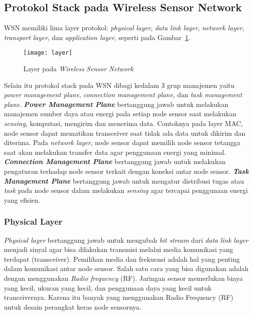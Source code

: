 \subsection{Protokol Stack pada Wireless Sensor Network \cite{a_wireless_sensor} \cite{handbook} \cite{overview:0:wireless}} 
WSN memiliki lima layer protokol: \textit{physical layer}, \textit{data link layer}, \textit{network layer}, \textit{transport layer}, dan \textit{application layer}, seperti pada Gambar~\ref{fig:layer}. 

\begin{figure} [H]
	\centering  
	\texttt{[image: layer]}  
	\caption[Layer pada \textit{Wireless Sensor Network}]{Layer pada \textit{Wireless Sensor Network}} 
	\label{fig:layer} 
\end{figure} 

Selain itu protokol stack pada WSN dibagi kedalam 3 grup manajemen yaitu \textit{power management plane}, \textit{connection management plane}, dan \textit{task management plane}. \textbf{\textit{Power Management Plane}} bertanggung jawab untuk melakukan manajemen sumber daya atau energi pada setiap node sensor saat melakukan \textit{sensing}, komputasi, mengirim dan menerima data.\cite{overview:0:wireless} Contohnya pada layer MAC, node sensor dapat mematikan transceiver saat tidak ada data untuk dikirim dan diterima. Pada \textit{network layer}, node sensor dapat memilih node sensor tetangga saat akan melakukan transfer data agar penggunaan energi yang minimal. \textbf{\textit{Connection Management Plane}} bertanggung jawab untuk melakukan pengaturan terhadap node sensor terkait dengan koneksi antar node sensor. \textbf{\textit{Task Management Plane}} bertanggung jawab untuk mengatur distribusi tugas atau \textit{task} pada node sensor dalam melakukan \textit{sensing} agar tercapai penggunaan energi yang efisien. 

\subsubsection{Physical Layer}
\textit{Physical layer} bertanggung jawab untuk mengubah \textit{bit stream} dari \textit{data link layer} menjadi sinyal agar bisa dilakukan transmisi melalui media komunikasi yang terdapat (transceiver). Pemilihan media dan frekuensi adalah hal yang penting dalam komunikasi antar node sensor. Salah satu cara yang bisa digunakan adalah dengan menggunakan \textit{Radio frequency} (RF). Jaringan sensor memerlukan biaya yang kecil, ukuran yang kecil, dan penggunaan daya yang kecil untuk tranceivernya. Karena itu banyak yang menggunakan Radio Frequency (RF) untuk desain perangkat keras node sensornya.

